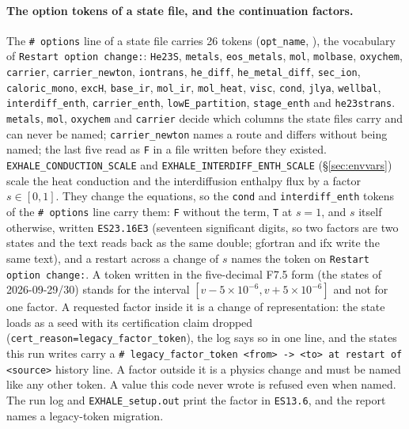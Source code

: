 \documentclass[english,a4paper]{my_memo}
\begin{document}
\paragraph{The option tokens of a state file, and the continuation factors.}\label{sec:factortokens}
The \texttt{\# options} line of a state file carries 26 tokens
(\texttt{opt\_name}, ), the vocabulary of
\texttt{Restart option change:}: \texttt{He23S}, \texttt{metals},
\texttt{eos\_metals}, \texttt{mol}, \texttt{molbase}, \texttt{oxychem},
\texttt{carrier}, \texttt{carrier\_newton}, \texttt{iontrans},
\texttt{he\_diff}, \texttt{he\_metal\_diff}, \texttt{sec\_ion},
\texttt{caloric\_mono}, \texttt{excH}, \texttt{base\_ir}, \texttt{mol\_ir},
\texttt{mol\_heat}, \texttt{visc}, \texttt{cond}, \texttt{jlya},
\texttt{wellbal}, \texttt{interdiff\_enth}, \texttt{carrier\_enth},
\texttt{lowE\_partition}, \texttt{stage\_enth} and \texttt{he23strans}.
\texttt{metals}, \texttt{mol}, \texttt{oxychem} and \texttt{carrier} decide
which columns the state files carry and can never be named;
\texttt{carrier\_newton} names a route and differs without being named; the
last five read as \texttt{F} in a file written before they existed.
\texttt{EXHALE\_CONDUCTION\_SCALE} and \texttt{EXHALE\_INTERDIFF\_ENTH\_SCALE}
(\S\ref{sec:envvars}) scale the heat conduction and the interdiffusion
enthalpy flux by a factor $s\in[0,1]$. They change the equations, so the
\texttt{cond} and \texttt{interdiff\_enth} tokens of the \texttt{\# options}
line carry them: \texttt{F} without the term, \texttt{T} at $s = 1$, and $s$
itself otherwise, written \texttt{ES23.16E3} (seventeen significant digits,
so two factors are two states and the text reads back as the same double;
gfortran and ifx write the same text), and a restart across a change of $s$
names the token on \texttt{Restart option change:}. A token written in the
five-decimal F7.5 form (the states of 2026-09-29/30) stands for the interval
$[v-5\times10^{-6}, v+5\times10^{-6}]$ and not for one factor. A requested
factor inside it is a change of representation: the state loads as a seed
with its certification claim dropped (\texttt{cert\_reason=legacy\_factor\_token}),
the log says so in one line, and the states this run writes carry a
\texttt{\# legacy\_factor\_token <from> -> <to> at restart of <source>}
history line. A factor outside it is a physics change and must be named like
any other token. A value this code never wrote is refused even when named.
The run log and \texttt{EXHALE\_setup.out} print the factor in
\texttt{ES13.6}, and the report names a legacy-token migration.
\end{document}
